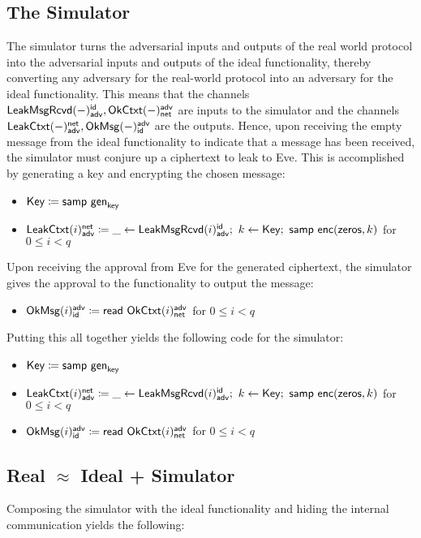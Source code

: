 \subsection{The Simulator}
The simulator turns the adversarial inputs and outputs of the real world protocol into the adversarial inputs and outputs of the ideal functionality, thereby converting any adversary for the real-world protocol into an adversary for the ideal functionality. This means that the channels $\mathsf{LeakMsgRcvd}(-)^{\mathsf{id}}_{\mathsf{adv}}, \mathsf{OkCtxt}(-)^{\mathsf{adv}}_{\mathsf{net}}$ are inputs to the simulator and the channels $\mathsf{LeakCtxt}(-)^{\mathsf{net}}_{\mathsf{adv}}, \mathsf{OkMsg}(-)^{\mathsf{adv}}_{\mathsf{id}}$ are the outputs. Hence, upon receiving the empty message from the ideal functionality to indicate that a message has been received, the simulator must conjure up a ciphertext to leak to Eve. This is accomplished by generating a key and encrypting the chosen message:
\begin{itemize}
\item $\mathsf{Key} \coloneqq \mathsf{samp} \ \mathsf{gen}_{\mathsf{key}}$
\item $\LeakCtxt(i)^\net_\adv \coloneqq \_ \leftarrow \LeakMsgRcvd(i)^\id_\adv; \ k \leftarrow \Key; \ \samp{\enc(\zeros,k)}$ for $0 \leq i < q$
\end{itemize}
Upon receiving the approval from Eve for the generated ciphertext, the simulator gives the approval to the functionality to output the message:
\begin{itemize}
\item $\mathsf{OkMsg}(i)^{\mathsf{adv}}_{\mathsf{id}} \coloneqq \mathsf{read} \ \mathsf{OkCtxt}(i)^{\mathsf{adv}}_{\mathsf{net}}$ for $0 \leq i < q$
\end{itemize}
Putting this all together yields the following code for the simulator:
\begin{itemize}
\item $\mathsf{Key} \coloneqq \mathsf{samp} \ \mathsf{gen}_{\mathsf{key}}$
\item $\LeakCtxt(i)^\net_\adv \coloneqq \_ \leftarrow \LeakMsgRcvd(i)^\id_\adv; \ k \leftarrow \Key; \ \samp{\enc(\zeros,k)}$ for $0 \leq i < q$
\item $\mathsf{OkMsg}(i)^{\mathsf{adv}}_{\mathsf{id}} \coloneqq \mathsf{read} \ \mathsf{OkCtxt}(i)^{\mathsf{adv}}_{\mathsf{net}}$ for $0 \leq i < q$
\end{itemize}

\subsection{Real \texorpdfstring{$\approx$}{Approximates} Ideal + Simulator}
Composing the simulator with the ideal functionality and hiding the internal communication yields the following:

